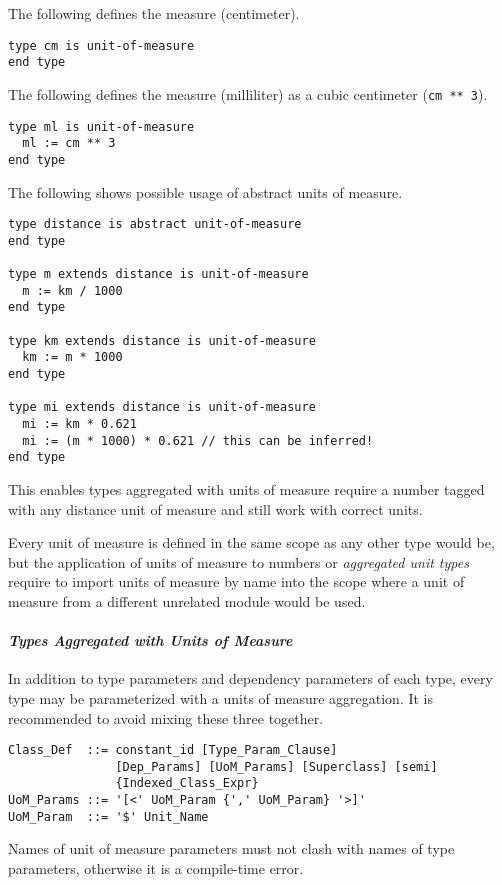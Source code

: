 \example The following defines the measure  (centimeter).
\begin{lstlisting}
type cm is unit-of-measure
end type
\end{lstlisting}

\example The following defines the measure  (milliliter) as a cubic centimeter (\lstinline!cm ** 3!).
\begin{lstlisting}
type ml is unit-of-measure
  ml := cm ** 3
end type
\end{lstlisting}

\example The following shows possible usage of abstract units of measure. 
\begin{lstlisting}
type distance is abstract unit-of-measure
end type

type m extends distance is unit-of-measure
  m := km / 1000
end type

type km extends distance is unit-of-measure
  km := m * 1000
end type

type mi extends distance is unit-of-measure
  mi := km * 0.621
  mi := (m * 1000) * 0.621 // this can be inferred!
end type
\end{lstlisting}
This enables types aggregated with units of measure require a number tagged with any distance unit of measure and still work with correct units. 

Every unit of measure is defined in the same scope as any other type would be, but the application of units of measure to numbers or {\em aggregated unit types} require to import units of measure by name into the scope where a unit of measure from a different unrelated module would be used. 

\paragraph{\em Types Aggregated with Units of Measure}
In addition to type parameters and dependency parameters of each type, every type may be parameterized with a units of measure aggregation. It is recommended to avoid mixing these three together. 

\syntax\begin{lstlisting}[mathescape=false]
Class_Def  ::= constant_id [Type_Param_Clause]
               [Dep_Params] [UoM_Params] [Superclass] [semi]
               {Indexed_Class_Expr}
UoM_Params ::= '[<' UoM_Param {',' UoM_Param} '>]'
UoM_Param  ::= '$' Unit_Name
\end{lstlisting}

Names of unit of measure parameters must not clash with names of type parameters, otherwise it is a compile-time error. 


